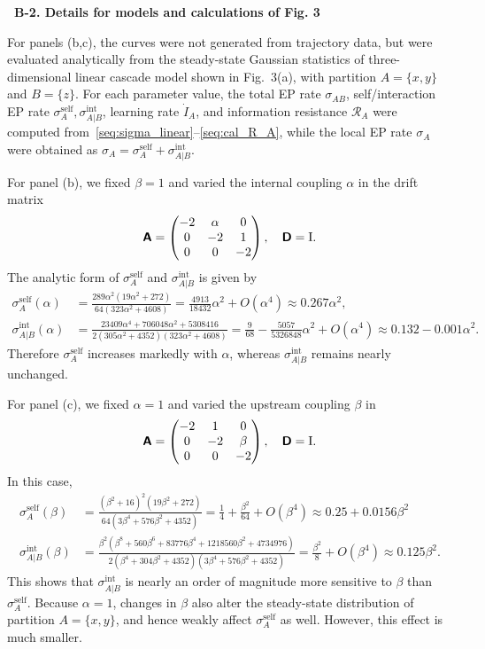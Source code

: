 \bigskip
\noindent\textbf{\textbullet\ B-2. Details for models and calculations of Fig. 3}

For panels (b,c), the curves were not generated from trajectory data, but were evaluated analytically from the steady-state Gaussian statistics of three-dimensional linear cascade model shown in Fig.~3(a), with partition $A=\{x,y\}$ and $B=\{z\}$. For each parameter value, the total EP rate $\sigma_{AB}$, self/interaction EP rate $\sigma_A^{\mathrm{self}},\sigma_{A|B}^{\mathrm{int}}$, learning rate $\dot I_A$, and information resistance $\mathcal R_A$ were computed from~\eqref{seq:sigma_linear}--\eqref{seq:cal_R_A}, while the local EP rate $\sigma_A$ were obtained as $\sigma_A=\sigma_A^{\mathrm{self}}+\sigma_{A|B}^{\mathrm{int}}$.

For panel (b), we fixed $\beta=1$ and varied the internal coupling $\alpha$ in the drift matrix
\[
\boldsymbol{\mathsf{A}}=
\begin{pmatrix}
    -2 & \alpha & 0 \\
    0 & -2 & 1 \\
    0 & 0 & -2
\end{pmatrix},
\quad
\boldsymbol{\mathsf{D}}=\mathrm I.
\]
The analytic form of $\sigma_A^{\mathrm{self}}$ and $\sigma_{A|B}^{\mathrm{int}}$ is given by
\begin{align*}
    \sigma_A^{\mathrm{self}}(\alpha)
    &=\frac{289\alpha^2(19\alpha^2+272)}{64(323\alpha^2+4608)}
    =\frac{4913}{18432}\alpha^2+O(\alpha^4)
    \approx0.267\alpha^2,
    \\
    \sigma_{A|B}^{\mathrm{int}}(\alpha)
    &=\frac{23409\alpha^4+706048\alpha^2+5308416}{2(305\alpha^2+4352)(323\alpha^2+4608)}
    =\frac{9}{68}-\frac{5057}{5326848}\alpha^2+O(\alpha^4)
    \approx
    0.132-0.001\alpha^2.
\end{align*}
Therefore $\sigma_A^{\mathrm{self}}$ increases markedly with $\alpha$, whereas $\sigma_{A|B}^{\mathrm{int}}$ remains nearly unchanged.

For panel (c), we fixed $\alpha=1$ and varied the upstream coupling $\beta$ in
\[
\boldsymbol{\mathsf{A}}=
\begin{pmatrix}
    -2 & 1 & 0 \\
    0 & -2 & \beta \\
    0 & 0 & -2
\end{pmatrix},
\quad
\boldsymbol{\mathsf{D}}=\mathrm I.
\]
In this case,
\begin{align*}
    \sigma_A^{\mathrm{self}}(\beta)
    &=\frac{(\beta^2+16)^2(19\beta^2+272)}{64(3\beta^4+576\beta^2+4352)}
    =\frac{1}{4}+\frac{\beta^2}{64}+O(\beta^4)
    \approx
    0.25+0.0156\beta^2
    \\
    \sigma_{A|B}^{\mathrm{int}}(\beta)
    &=\frac{\beta^2(\beta^8+560\beta^6+83776\beta^4+1218560\beta^2+4734976)}{2(\beta^4+304\beta^2+4352)(3\beta^4+576\beta^2+4352)}
    =\frac{\beta^2}{8}+O(\beta^4)
    \approx0.125\beta^2.
\end{align*}
This shows that $\sigma_{A|B}^{\mathrm{int}}$ is nearly an order of magnitude more sensitive to $\beta$ than $\sigma_{A}^{\mathrm{self}}$.
Because $\alpha=1$, changes in $\beta$ also alter the steady-state distribution of partition $A=\{x,y\}$, and hence weakly affect $\sigma_A^{\mathrm{self}}$ as well. However, this effect is much smaller.

